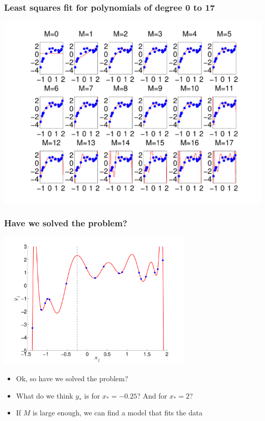 \begin{frame}
\frametitle{Least squares fit for polynomials of degree 0 to 17}

\centerline{\includegraphics[width=\textwidth]{fitted_polynomials.pdf}}

\end{frame}
\begin{frame}
\frametitle{Have we solved the problem?}

\centerline{\includegraphics[width=0.7\textwidth]{toy_data_polynomial_overfit.pdf}}

\begin{itemize}
\item Ok, so have we solved the problem?
\item What do we think $y_*$ is for $x_*=-0.25$? And for $x_*=2$?
\item If $M$ is large enough, we can find a model that fits the data 
\end{itemize}


\end{frame}

